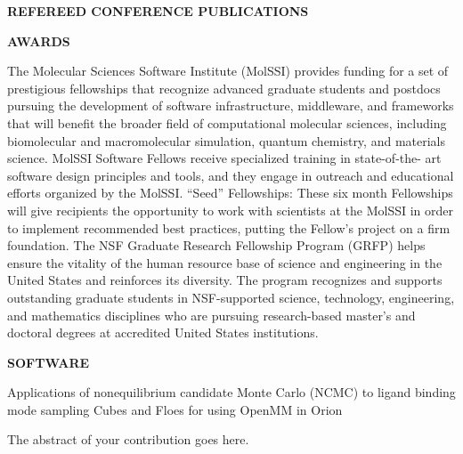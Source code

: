 {  
  
\vspace{12pt}
\textbf{REFEREED CONFERENCE PUBLICATIONS}

  
\vspace{12pt}
\textbf{AWARDS}

  {The Molecular Sciences Software Institute (MolSSI) provides funding for a set of prestigious fellowships that recognize advanced graduate students and postdocs pursuing the development of software infrastructure, middleware, and frameworks that will benefit the broader field of computational molecular sciences, including biomolecular and macromolecular simulation, quantum chemistry, and materials science. MolSSI Software Fellows receive specialized training in state-of-the- art software design principles and tools, and they engage in outreach and educational efforts organized by the MolSSI.}
  {“Seed” Fellowships: These six month Fellowships will give recipients the opportunity to work with scientists at the MolSSI in order to implement recommended best practices, putting the Fellow’s project on a firm foundation.}
  {The NSF Graduate Research Fellowship Program (GRFP) helps ensure the vitality of the human resource base of science and engineering in the United States and reinforces its diversity. The program recognizes and supports outstanding graduate students in NSF-supported science, technology, engineering, and mathematics disciplines who are pursuing research-based master's and doctoral degrees at accredited United States institutions.}
  
\vspace{12pt}
\textbf{SOFTWARE}

  {Applications of nonequilibrium candidate Monte Carlo (NCMC) to ligand binding mode sampling}
  {Cubes and Floes for using OpenMM in Orion}
  

}

\thesisabstract
{
  The abstract of your contribution goes here.
}


